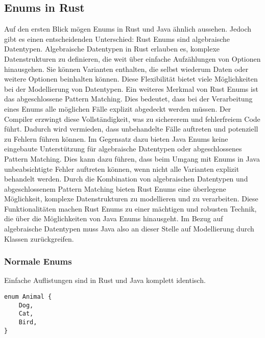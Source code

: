 \documentclass[a4paper, 1ppt]{article}
\begin{document}
\subsection{Enums in Rust}
Auf den ersten Blick mögen Enums in Rust und Java ähnlich aussehen. Jedoch gibt es einen entscheidenden Unterschied: Rust Enums sind algebraische Datentypen.
Algebraische Datentypen in Rust erlauben es, komplexe Datenstrukturen zu definieren, die weit über einfache Aufzählungen von Optionen hinausgehen. Sie können Varianten enthalten, die selbst wiederum Daten oder weitere Optionen beinhalten können. Diese Flexibilität bietet viele Möglichkeiten bei der Modellierung von Datentypen.
Ein weiteres Merkmal von Rust Enums ist das abgeschlossene Pattern Matching. Dies bedeutet, dass bei der Verarbeitung eines Enums alle möglichen Fälle explizit abgedeckt werden müssen. Der Compiler erzwingt diese Vollständigkeit, was zu sichererem und fehlerfreiem Code führt. Dadurch wird vermieden, dass unbehandelte Fälle auftreten und potenziell zu Fehlern führen können.
Im Gegensatz dazu bieten Java Enums keine eingebaute Unterstützung für algebraische Datentypen oder abgeschlossenes Pattern Matching. Dies kann dazu führen, dass beim Umgang mit Enums in Java unbeabsichtigte Fehler auftreten können, wenn nicht alle Varianten explizit behandelt werden.
Durch die Kombination von algebraischen Datentypen und abgeschlossenem Pattern Matching bieten Rust Enums eine überlegene Möglichkeit, komplexe Datenstrukturen zu modellieren und zu verarbeiten. Diese Funktionalitäten machen Rust Enums zu einer mächtigen und robusten Technik, die über die Möglichkeiten von Java Enums hinausgeht. Im Bezug auf algebraische Datentypen muss Java also an dieser Stelle auf Modellierung durch Klassen zurückgreifen.
\subsubsection{Normale Enums}
Einfache Auflistungen sind in Rust und Java komplett identisch.
\begin{verbatim}
enum Animal {
    Dog,
    Cat,
    Bird,
}
\end{verbatim}
\newpage
\end{document}
